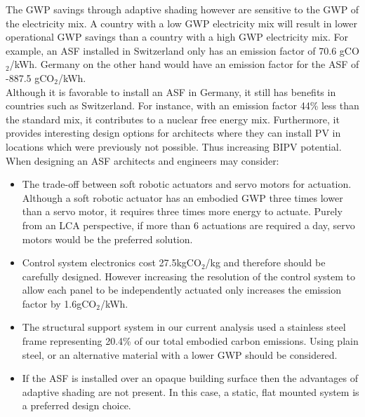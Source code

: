 The GWP savings through adaptive shading however are sensitive to the GWP of the electricity mix. A country with a low GWP electricity mix will result in lower operational GWP savings than a country with a high GWP electricity mix. For example, an ASF installed in Switzerland only has an emission factor of 70.6 gCO${_2}$/kWh. Germany on the other hand would have an emission factor for the ASF of -887.5  gCO${_2}$/kWh.\\

Although it is favorable to install an ASF in Germany, it still has benefits in countries such as Switzerland. For instance, with an emission factor 44\% less than the standard mix, it contributes to a nuclear free energy mix. Furthermore, it provides interesting design options for architects where they can install PV in locations which were previously not possible. Thus increasing BIPV potential.  \\

When designing an ASF architects and engineers may consider: 
\begin{itemize}
\item The trade-off between soft robotic actuators and servo motors for actuation. Although a soft robotic actuator has an embodied GWP three times lower than a servo motor, it requires three times more energy to actuate. Purely from an LCA perspective, if more than 6 actuations are required a day, servo motors would be the preferred solution. 
\item Control system electronics cost 27.5kgCO${_2}$/kg and therefore should be carefully designed. However increasing the resolution of the control system to allow each panel to be independently actuated only increases the emission factor by 1.6gCO${_2}$/kWh.
\item The structural support system in our current analysis used a stainless steel frame representing 20.4\% of our total embodied carbon emissions. Using plain steel, or an alternative material with a lower GWP should be considered.
\item If the ASF is installed over an opaque building surface then the advantages of adaptive shading are not present. In this case, a static, flat mounted system is a preferred design choice. 
\end{itemize}

